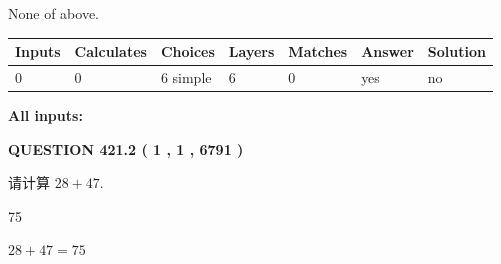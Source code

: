 \documentclass{ctexart}
\begin{document}
 
 None of above.
 
 
\noindent{}
 
 
   
   
   
   
\noindent\begin{tabular}{|l|l|l|l|l|l|l|}
 \hline
Inputs & Calculates & Choices & Layers & Matches & Answer & Solution \\ \hline
 0  & 
 0  & 
 6
  simple  
  & 
 6  & 
 0  & 
  yes & 
  no 
  \\ \hline
 \end{tabular}
   
   
   
   
\noindent{}
   
   
   
   
\noindent\vspace{0.1in}\hspace{-0.08in} {\textbf{\Large{All inputs: }}}
   
   
  
\vspace{0.2in}
  
{\textbf{\Large{QUESTION
421.2 
 ( 1 , 1 , 6791 )
}}}
  
  
 
请计算 $ %
28 +  %
47 $.
 
 
 
\noindent{}
 
 

75
 
 
\noindent{}
 
 

 
 
 
\noindent{}
 
 

$ %
28 +  %
47=   %
75$
 
 
\noindent{}
 
 

 
   
   
   
\end{document}
